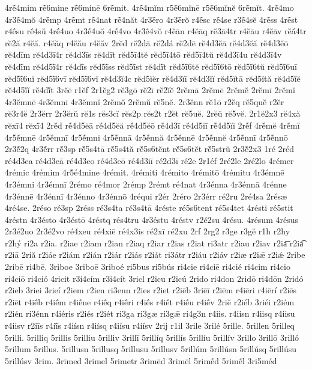 {4rḗ4mim
rḗ6mine
rḗ6minē
6rḗmit.
4rḗ4mĭm
r5ḗ6mĭnē
r5ḗ6mĭnĕ
6rḗmĭt.
4rḗ4mo
4r3ḗ4mŏ
4rḗmp
4rḗmt
rḗ4nat
rḗ4năt
4r3ḗro
4r3ḗrŏ
r4ḗsc
rḗ4se
r3ḗ4sĕ
4rḗss
4rḗst
r4ḗsu
rḗ4sŭ
4rḗ4uo
4r3ḗ4uŏ
4rḗ4vo
4r3ḗ4vŏ
r4ĕān
r4ĕāq
rĕ3ā4tr
r4ĕāu
r4ĕāv
rĕā́4tr
rĕ2ă
r4ĕă.
r4ĕăq
r4ĕău
r4ĕăv
2rĕd
rĕ2dā
rĕ2dá
rĕ2dē
rĕ4d3ĕā
rĕ4d3ĕă
rĕ4d3ĕō
rĕ4dīm
rĕ4d3ī4r
rĕ4d3īs
rĕ4dīt
rĕd5ī4tĕ
rĕd5ī4tō
rĕd5ī4tŭ
rĕ4d3ī4u
rĕ4d3ī4v
rĕ4dī́m
rĕ4d5ī́4r
rĕ4dī́s
rĕd5ī́ss
rĕd5ī́st
rĕ4dī́t
rĕd5ī́6tĕ
rĕd5ī́6tō
rĕd5ī́6tŭ
rĕd5ī́6uī
rĕd5ī́6uĭ
rĕd5ī́6vī
rĕd5ī́6vĭ
rĕ4d3ĭ4c
rĕd5ĭĕr
rĕ4d3ĭī
rĕ4d3ĭĭ
rĕd5ĭtā
rĕd5ĭtă
rĕ4d5ĭ́ĕ
rĕ4d5ĭ́ĭ
rĕ4dĭ́t
3rĕē
r1ĕf
2r1ĕg2
rĕ3gō
rĕ2ī
rĕ2ĭĕ
2rĕmā
2rĕmē
2rĕmĕ
2rĕmī
2rĕmĭ
4r3ĕmnē
4r3ĕmnī
4r3ĕmnĭ
2rĕmŏ
2rĕmŭ
rĕ5nĕ.
2r3ĕnn
rĕ1ō
r2ĕq
rĕ5quĕ
r2ĕr
rĕ3r4ĕ
2r3ĕrr
2r3ĕrŭ
rĕ1s
rĕs3cĭ
rĕs2p
rĕs2t
r2ĕt
rĕ5uĕ.
2rĕŭ
rĕ5vĕ.
2r1ĕ2x3
rĕ4xă
rĕxī4
rĕxī́4
2rĕ́d
rĕ́4d5ĕā
rĕ́4d5ĕă
rĕ́4d5ĕō
rĕ́4d3ī
rĕ́4d5ĭī
rĕ́4d5ĭĭ
2rĕ́f
4rĕ́mĕ
4rĕ́mĭ
4r5ĕ́mnē
4r5ĕ́mnī
4r5ĕ́mnĭ
4r5ĕ́nnā
4r5ĕ́nnă
4r5ĕ́nnē
4r5ĕ́nnĕ
4r5ĕ́nnī
4r5ĕ́nnō
2r3ĕ́2q
4r3ĕ́rr
rĕ́3sp
rĕ́5s4tā
rĕ́5s4tă
rĕ́5s6tĕnt
rĕ́5s6tĕt
rĕ́5strŭ
2r3ĕ́2x3
1ré
2réd
ré4d3ea
ré4d3eā
ré4d3eo
ré4d3eō
ré4d3iī
ré2d3ī
ré2e
2r1éf
2ré2le
2ré2lo
4rémer
4rémic
4rémim
4r5é4mine
4rémit.
4rémiti
4rémito
4rémitō
4rémitu
4r3émnē
4r3émni
4r3émnī
2rémo
ré4mor
2rémp
2rémt
ré4nat
4r3énna
4r3énnā
4rénne
4r3énnē
4r3énnī
4r3énno
4r3énnō
4réqui
r2ér
2réro
2r3érr
ré2ru
2ré4sa
2résæ
4ré4se.
2réso
ré3sp
2réss
ré3s4ta
ré3s4tā
4réste
ré5s6tent
ré5s4tet
4résti
ré5stit
4réstn
4r3ésto
4r3éstō
4réstq
rés4tru
4r3éstu
4réstv
r2é2su
4résu.
4résum
4résus
2r3é2uo
2r3é2vo
ré4xeu
ré4xiē
ré4x3is
ré2xī
ré2xu
2rf
2rg2
r3ge
r3gĕ
r1h
r2hy
r2hý
ri2a
r2ia.
r2iae
r2iam
r2ian
r2iaq
r2iar
r2ias
r2iat
ri3atr
r2iau
r2iav
r2ia͞
r2ia͡
r2iā
2riă
r2iáe
r2iám
r2ián
r2iár
r2iás
r2iát
ri3átr
r2iáu
r2iáv
r2iæ
r2iǣ
r2iǽ
2ribe
2ribē
ri4bē.
3riboe
3riboē
3riboé
ri5bus
ri5bús
ri4cie
ri4ciē
ri4cié
ri4cim
ri4cio
ri4ciō
ri4ció
4ricit
r3i4cím
r3i4cít
3ricl
r2icu
r2icú
2rido
ri4don
2ridō
ri4dōn
2ridó
r2ieb
3riei
3rieí
r2iem
r2ien
ri3enn
r2ies
r2iet
r2iēb
3riēī
r2iēm
r4iēri
r4iērí
r2iēs
r2iēt
r4iḗb
r4iḗm
r4iḗne
r4iḗq
r4iḗri
r4iḗs
r4iḗt
r4iḗu
r4iḗv
2riĕ
r2iéb
3riéi
r2iém
r2ién
ri3énn
r4iéris
r2iés
r2iét
ri3ga
ri3gæ
ri3gǣ
ri4g3n
r4iis.
r4iisn
r4iisq
r4iisu
r4iisv
r2iīs
r4iī́s
r4iísn
r4iísq
r4iísu
r4iísv
2rij
r1il
3rile
3rilé
5rille.
5rillen
5rilleq
5rilli.
5rilliq
5rillis
5rilliu
5rilliv
3rillī
5rillíq
5rillís
5rillíu
5rillív
3rillo
3rillō
3rilló
5rillum
5rillus.
5rillusn
5rillusq
5rillusu
5rillusv
5rillúm
5rillúsn
5rillúsq
5rillúsu
5rillúsv
3rim.
3rimed
3rimel
5rimetr
3rimēd
3rimēl
5rimḗd
5rimḗl
3ri5méd
}
